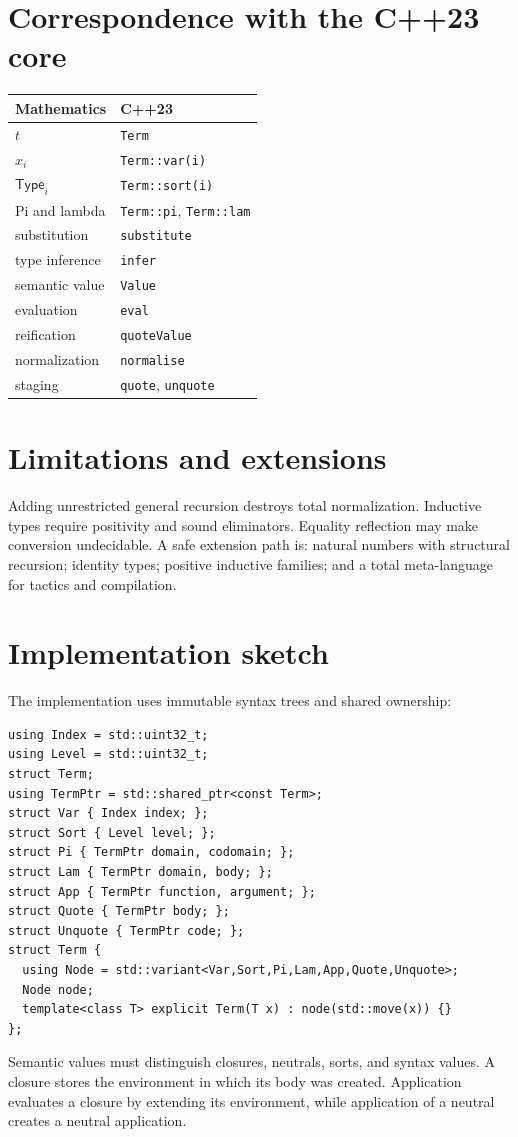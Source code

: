 \documentclass[11pt,a4paper]{article}
\newcommand{\Ty}{\mathsf{Type}}
\begin{document}
\section{Correspondence with the C++23 core}
\begin{center}\begin{tabular}{ll}
Mathematics & C++23 \\\hline
$t$ & \texttt{Term} \\
$x_i$ & \texttt{Term::var(i)} \\
$\Ty_i$ & \texttt{Term::sort(i)} \\
Pi and lambda & \texttt{Term::pi}, \texttt{Term::lam} \\
substitution & \texttt{substitute} \\
type inference & \texttt{infer} \\
semantic value & \texttt{Value} \\
evaluation & \texttt{eval} \\
reification & \texttt{quoteValue} \\
normalization & \texttt{normalise} \\
staging & \texttt{quote}, \texttt{unquote}
\end{tabular}\end{center}

\section{Limitations and extensions}
Adding unrestricted general recursion destroys total normalization. Inductive types require positivity and sound eliminators. Equality reflection may make conversion undecidable. A safe extension path is: natural numbers with structural recursion; identity types; positive inductive families; and a total meta-language for tactics and compilation.

\section{Implementation sketch}
The implementation uses immutable syntax trees and shared ownership:
\begin{lstlisting}
using Index = std::uint32_t;
using Level = std::uint32_t;
struct Term;
using TermPtr = std::shared_ptr<const Term>;
struct Var { Index index; };
struct Sort { Level level; };
struct Pi { TermPtr domain, codomain; };
struct Lam { TermPtr domain, body; };
struct App { TermPtr function, argument; };
struct Quote { TermPtr body; };
struct Unquote { TermPtr code; };
struct Term {
  using Node = std::variant<Var,Sort,Pi,Lam,App,Quote,Unquote>;
  Node node;
  template<class T> explicit Term(T x) : node(std::move(x)) {}
};
\end{lstlisting}
Semantic values must distinguish closures, neutrals, sorts, and syntax values. A closure stores the environment in which its body was created. Application evaluates a closure by extending its environment, while application of a neutral creates a neutral application.
\end{document}
